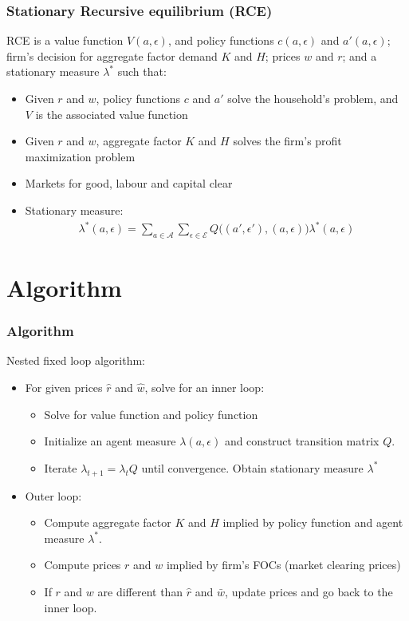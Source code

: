 \documentclass{beamer}
\begin{document}
\begin{frame}
\frametitle{Stationary Recursive equilibrium (RCE)} 
RCE is a value function $V(a,\epsilon)$, and policy functions $c(a,\epsilon)$ and $a'(a,\epsilon)$; firm's decision for aggregate factor demand $K$ and $H$; prices $w$ and $r$; and a stationary measure $\lambda^*$ such that: 
\begin{itemize}
	\item Given $r$ and $w$, policy functions $c$ and $a'$ solve the household's problem, and $V$ is the associated value function
	\item Given $r$ and $w$, aggregate factor $K$ and $H$ solves the firm's profit maximization problem 
	\item Markets for good, labour and capital clear
	\item Stationary measure: 
\begin{equation}
\begin{aligned}
\lambda^*(a,\epsilon) 
= \sum_{a \in \mathcal{A} } 
\sum_{\epsilon \in \mathcal{E}} 
Q\big( (a',\epsilon'),(a,\epsilon) \big)
\lambda^*(a,\epsilon)
\end{aligned}
\end{equation}
\end{itemize}

\end{frame}


\section{Algorithm}
\begin{frame}
\frametitle{Algorithm}
Nested fixed loop algorithm: 
\begin{itemize}
	\item For given prices $\hat{r}$ and $\hat{w}$, solve for an inner loop:
	\begin{itemize}
		\item Solve for value function and policy function
		\item Initialize an agent measure $\lambda(a,\epsilon)$ and construct transition matrix $Q$. 
		\item Iterate $\lambda_{t+1} = \lambda_t Q$ until convergence. Obtain stationary measure $\lambda^*$
	\end{itemize}
\item Outer loop: 
\begin{itemize}
	\item Compute aggregate factor $K$ and $H$ implied by policy function and agent measure $\lambda^*$. 
	\item Compute prices $r$ and $w$ implied by firm's FOCs (market clearing prices)
	\item If $r$ and $w$ are different than $\hat{r}$ and $\bar{w}$, update prices and go back to the inner loop. 
\end{itemize}
\end{itemize}
\end{frame}
\end{document}
